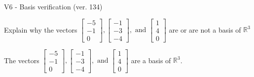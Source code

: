 \begin{exercise}
  \begin{exerciseTitle}V6 - Basis verification (ver. 134)\end{exerciseTitle}
  \begin{exerciseStatement}
    Explain why the vectors \(\left[\begin{array}{r}
-5 \\
-1 \\
0
\end{array}\right] , \left[\begin{array}{r}
-1 \\
-3 \\
-4
\end{array}\right] , \text{ and } \left[\begin{array}{r}
1 \\
4 \\
0
\end{array}\right]\) are or are not a basis of \(\mathbb{R}^3\)	


  \end{exerciseStatement}
  \begin{exerciseAnswer}
   The vectors \(\left[\begin{array}{r}
-5 \\
-1 \\
0
\end{array}\right] , \left[\begin{array}{r}
-1 \\
-3 \\
-4
\end{array}\right] , \text{ and } \left[\begin{array}{r}
1 \\
4 \\
0
\end{array}\right]\) 
  	 are  a basis of \(\mathbb{R}^3\).
  


  \end{exerciseAnswer}
\end{exercise}